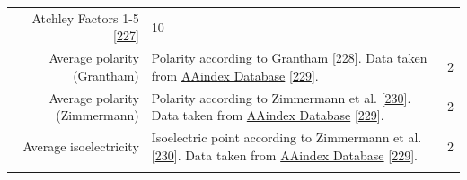 \documentclass[11pt,a4paper,twoside]{book}
\theoremstyle{definition}
\theoremstyle{definition}
\theoremstyle{remark}
\begin{document}
\begin{longtable}[]{@{}rlc@{}}
\begin{minipage}[t]{0.50\columnwidth}
Atchley Factors 1-5 {[}\protect\hyperlink{ref-Atchley2005}{227}{]}\strut
\end{minipage} & \begin{minipage}[t]{0.18\columnwidth}\centering\strut
10\strut
\end{minipage}\tabularnewline
\begin{minipage}[t]{0.23\columnwidth}\raggedleft\strut
Average polarity (Grantham)\strut
\end{minipage} & \begin{minipage}[t]{0.50\columnwidth}\raggedright\strut
Polarity according to Grantham
{[}\protect\hyperlink{ref-Grantham1974}{228}{]}. Data taken from
\href{http://www.genome.jp/dbget-bin/www_bget?aaindex:GRAR740102}{AAindex
Database} {[}\protect\hyperlink{ref-Kawashima2008}{229}{]}.\strut
\end{minipage} & \begin{minipage}[t]{0.18\columnwidth}\centering\strut
2\strut
\end{minipage}\tabularnewline
\begin{minipage}[t]{0.23\columnwidth}\raggedleft\strut
Average polarity (Zimmermann)\strut
\end{minipage} & \begin{minipage}[t]{0.50\columnwidth}\raggedright\strut
Polarity according to Zimmermann et al.
{[}\protect\hyperlink{ref-Zimmerman1968}{230}{]}. Data taken from
\href{http://www.genome.jp/dbget-bin/www_bget?aaindex:ZIMJ680103}{AAindex
Database} {[}\protect\hyperlink{ref-Kawashima2008}{229}{]}.\strut
\end{minipage} & \begin{minipage}[t]{0.18\columnwidth}\centering\strut
2\strut
\end{minipage}\tabularnewline
\begin{minipage}[t]{0.23\columnwidth}\raggedleft\strut
Average isoelectricity\strut
\end{minipage} & \begin{minipage}[t]{0.50\columnwidth}\raggedright\strut
Isoelectric point according to Zimmermann et al.
{[}\protect\hyperlink{ref-Zimmerman1968}{230}{]}. Data taken from
\href{http://www.genome.jp/dbget-bin/www_bget?aaindex:ZIMJ680104}{AAindex
Database} {[}\protect\hyperlink{ref-Kawashima2008}{229}{]}.\strut
\end{minipage} & \begin{minipage}[t]{0.18\columnwidth}\centering\strut
2\strut
\end{minipage}\tabularnewline
\begin{minipage}[t]{0.23\columnwidth}\raggedleft\strut

\end{minipage}
\end{longtable}
\end{document}
